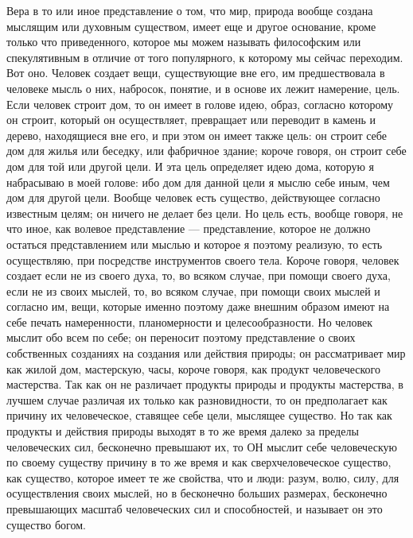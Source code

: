 \documentclass[12pt]{article}
\begin{document}
Вера в то или иное представление о том, что мир, природа вообще создана мыслящим или духовным существом, имеет еще и другое основание, кроме только что приведенного, которое мы можем называть философским или спекулятивным в отличие от того популярного, к которому мы сейчас переходим. Вот оно. Человек создает вещи, существующие вне его, им предшествовала в человеке мысль о них, набросок, понятие, и в основе их лежит намерение, цель. Если человек строит дом, то он имеет в голове идею, образ, согласно которому он строит, который он осуществляет, превращает или переводит в камень и дерево, находящиеся вне его, и при этом он имеет также цель: он строит себе дом для жилья или беседку, или фабричное здание; короче говоря, он строит себе дом для той или другой цели. И эта цель определяет идею дома, которую я набрасываю в моей голове: ибо дом для данной цели я мыслю себе иным, чем дом для другой цели. Вообще человек есть существо, действующее согласно известным целям; он ничего не делает без цели. Но цель есть, вообще говоря, не что иное, как волевое представление --- представление, которое не должно остаться представлением или мыслью и которое я поэтому реализую, то есть осуществляю, при посредстве инструментов своего тела. Короче говоря, человек создает если не из своего духа, то, во всяком случае, при помощи своего духа, если не из своих мыслей, то, во всяком случае, при помощи своих мыслей и согласно им, вещи, которые именно поэтому даже внешним образом имеют на себе печать намеренности, планомерности и целесообразности. Но человек мыслит обо всем по себе; он переносит поэтому представление о своих собственных созданиях на создания или действия природы; он рассматривает мир как жилой дом, мастерскую, часы, короче говоря, как продукт человеческого мастерства. Так как он не различает продукты природы и продукты мастерства, в лучшем случае различая их только как разновидности, то он предполагает как причину их человеческое, ставящее себе цели, мыслящее существо. Но так как продукты и действия природы выходят в то же время далеко за пределы человеческих сил, бесконечно превышают их, то ОН мыслит себе человеческую по своему существу причину в то же время и как сверхчеловеческое существо, как существо, которое имеет те же свойства, что и люди: разум, волю, силу, для осуществления своих мыслей, но в бесконечно больших размерах, бесконечно превышающих масштаб человеческих сил и способностей, и называет он это существо богом. 
\end{document}
